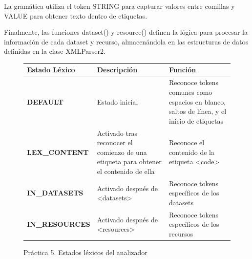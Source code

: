 La gramática utiliza el token STRING para capturar valores entre comillas y VALUE para obtener texto dentro de etiquetas.

Finalmente, las funciones dataset() y resource() definen la lógica para procesar la información de cada dataset y recurso, almacenándola en las estructuras de datos definidas en la clase XMLParser2.

\begin{figure}[H]
  \centering
  \begin{tabularx}{\textwidth}{>{\bfseries}l X X}
  \toprule
  \textbf{Estado Léxico} & \textbf{Descripción} & \textbf{Función} \\
  \midrule
  DEFAULT & Estado inicial & Reconoce tokens comunes como espacios en blanco, saltos de línea, y el inicio de etiquetas \\
  \midrule
  LEX\_CONTENT & Activado tras reconocer el comienzo de una etiqueta para obtener el contenido de ella & Reconoce el contenido de la etiqueta \textless code\textgreater \\
  \midrule
  IN\_DATASETS & Activado después de \textless datasets\textgreater & Reconoce tokens específicos de los datasets \\
  \midrule
  IN\_RESOURCES & Activado después de \textless resources\textgreater & Reconoce tokens específicos de los recursos \\
  \bottomrule
  \end{tabularx}
  \caption{\label{fig:estadoslexicosp5}Práctica 5. Estados léxicos del analizador}
  \label{table:lexical_states}
  \end{figure}


